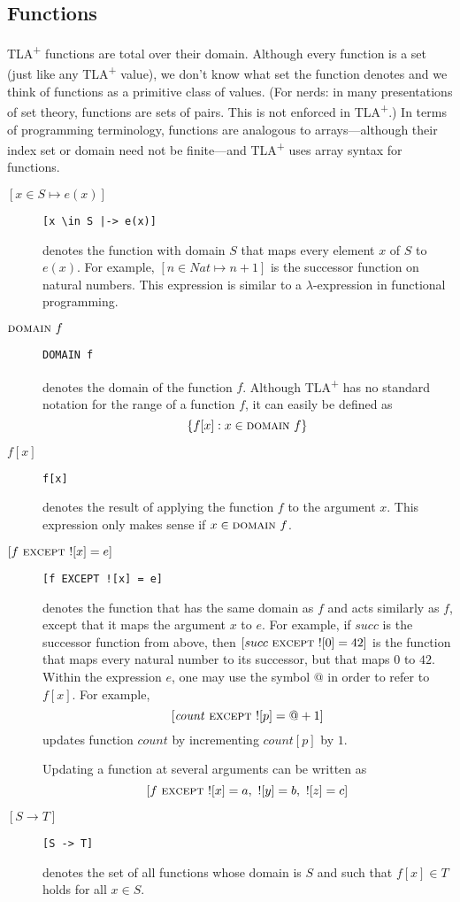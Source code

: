 \documentclass[11pt,fleqn]{article}
\newcommand{\tlaplus}{TLA\textsuperscript{+}\xspace}
\newcommand{\kw}[1]{\textnormal{\textsc{#1}}}
\newcommand{\DOMAIN}{\kw{domain}}
\newcommand{\EXCEPT}{\kw{except}}
\begin{document}
\subsection{Functions}

\tlaplus functions are total over their domain. Although every function is a set
(just like any \tlaplus value), we don't know what set the function denotes and
we think of functions as a primitive class of values. (For nerds: in many
presentations of set theory, functions are sets of pairs. This is not enforced
in \tlaplus.) In terms of programming terminology, functions are analogous to
arrays---although their index set or domain need not be finite---and \tlaplus
uses array syntax for functions.

\begin{description}
\item[\mbox{$[x \in S \mapsto e(x)]$}]\qquad \verb![x \in S |-> e(x)]!

  denotes the function with domain $S$ that maps every element $x$ of $S$ to
  $e(x)$. For example, $[n \in Nat \mapsto n+1]$ is the successor function on
  natural numbers. This expression is similar to a $\lambda$-expression in
  functional programming.
  
\item[$\DOMAIN~f$]\qquad \verb|DOMAIN f|

  denotes the domain of the function $f$. Although \tlaplus has no standard
  notation for the range of a function $f$, it can easily be defined as
  \[ \{f[x] : x \in \DOMAIN~f\} \]
  
\item[\mbox{$f[x]$}]\qquad \verb|f[x]|

  denotes the result of applying the function $f$ to the argument $x$. This
  expression only makes sense if $x \in \DOMAIN~f$.
  
\item[\mbox{$[f\ \EXCEPT\ ![x] = e]$}]\qquad \verb|[f EXCEPT ![x] = e]|

  denotes the function that has the same domain as $f$ and acts similarly as
  $f$, except that it maps the argument $x$ to $e$. For example, if $succ$ is
  the successor function from above, then $[succ\ \EXCEPT\ ![0] = 42]$ is the
  function that maps every natural number to its successor, but that maps $0$ to
  $42$. Within the expression $e$, one may use the symbol $@$ in order to refer
  to $f[x]$. For example,
  \[
    [\mathit{count}\ \EXCEPT\ ![p] = @+1]
  \]
  updates function $\mathit{count}$ by incrementing $\mathit{count}[p]$ by $1$.

  Updating a function at several arguments can be written as
  \[
    [f\ \EXCEPT\ ![x] = a,\ ![y] = b,\ ![z] = c]
  \]
  
\item[\mbox{$[S \rightarrow T]$}]\qquad \verb|[S -> T]|

  denotes the set of all functions whose domain is $S$ and such that $f[x] \in
  T$ holds for all $x \in S$.
\end{description}
\end{document}
